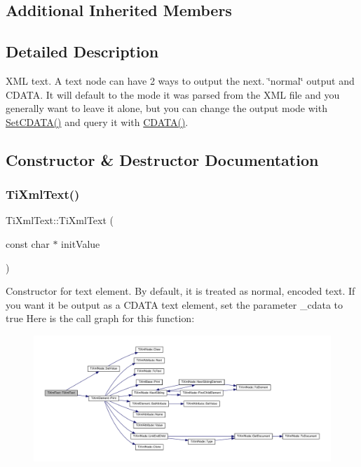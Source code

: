\subsection*{Additional Inherited Members}


\subsection{Detailed Description}
X\+ML text. A text node can have 2 ways to output the next. \char`\"{}normal\char`\"{} output and C\+D\+A\+TA. It will default to the mode it was parsed from the X\+ML file and you generally want to leave it alone, but you can change the output mode with \hyperlink{classTiXmlText_acb17ff7c5d09b2c839393445a3de5ea9}{Set\+C\+D\+A\+T\+A()} and query it with \hyperlink{classTiXmlText_aac1f4764d220ed6bf809b16dfcb6b45a}{C\+D\+A\+T\+A()}. 

\subsection{Constructor \& Destructor Documentation}
\mbox{\label{classTiXmlText_af659e77c6b87d684827f35a8f4895960}} 
\subsubsection{\texorpdfstring{Ti\+Xml\+Text()}{TiXmlText()}}
{\footnotesize\ttfamily Ti\+Xml\+Text\+::\+Ti\+Xml\+Text (\begin{DoxyParamCaption}\item[{const char $\ast$}]{init\+Value }\end{DoxyParamCaption})\hspace{0.3cm}{\ttfamily [inline]}}

Constructor for text element. By default, it is treated as normal, encoded text. If you want it be output as a C\+D\+A\+TA text element, set the parameter \+\_\+cdata to \textquotesingle{}true\textquotesingle{} Here is the call graph for this function\+:
\nopagebreak
\begin{figure}[H]
\begin{center}
\leavevmode
\includegraphics[width=350pt]{classTiXmlText_af659e77c6b87d684827f35a8f4895960_cgraph}
\end{center}
\end{figure}


